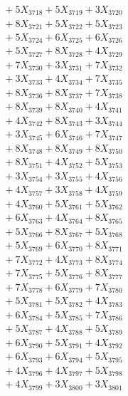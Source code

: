\documentclass[a4paper,10pt]{article}
\begin{document}
{\begin{align}
&\;  + 5 X_{3718} + 5 X_{3719} + 3 X_{3720} \\[0.3ex]
&\;  + 8 X_{3721} + 5 X_{3722} + 5 X_{3723} \\[0.3ex]
&\;  + 5 X_{3724} + 6 X_{3725} + 6 X_{3726} \\[0.3ex]
&\;  + 5 X_{3727} + 8 X_{3728} + 4 X_{3729} \\[0.5ex]\allowbreak
&\;  + 7 X_{3730} + 3 X_{3731} + 7 X_{3732} \\[0.3ex]
&\;  + 3 X_{3733} + 4 X_{3734} + 7 X_{3735} \\[0.3ex]
&\;  + 8 X_{3736} + 8 X_{3737} + 7 X_{3738} \\[0.3ex]
&\;  + 8 X_{3739} + 8 X_{3740} + 4 X_{3741} \\[0.3ex]
&\;  + 4 X_{3742} + 8 X_{3743} + 3 X_{3744} \\[0.3ex]
&\;  + 3 X_{3745} + 6 X_{3746} + 7 X_{3747} \\[0.3ex]
&\;  + 8 X_{3748} + 8 X_{3749} + 8 X_{3750} \\[0.3ex]
&\;  + 8 X_{3751} + 4 X_{3752} + 5 X_{3753} \\[0.3ex]
&\;  + 3 X_{3754} + 3 X_{3755} + 4 X_{3756} \\[0.3ex]
&\;  + 4 X_{3757} + 3 X_{3758} + 4 X_{3759} \\[0.5ex]\allowbreak
&\;  + 4 X_{3760} + 5 X_{3761} + 5 X_{3762} \\[0.3ex]
&\;  + 6 X_{3763} + 4 X_{3764} + 8 X_{3765} \\[0.3ex]
&\;  + 5 X_{3766} + 8 X_{3767} + 5 X_{3768} \\[0.3ex]
&\;  + 5 X_{3769} + 6 X_{3770} + 8 X_{3771} \\[0.3ex]
&\;  + 7 X_{3772} + 4 X_{3773} + 8 X_{3774} \\[0.3ex]
&\;  + 7 X_{3775} + 5 X_{3776} + 8 X_{3777} \\[0.3ex]
&\;  + 7 X_{3778} + 6 X_{3779} + 7 X_{3780} \\[0.3ex]
&\;  + 5 X_{3781} + 5 X_{3782} + 4 X_{3783} \\[0.3ex]
&\;  + 6 X_{3784} + 5 X_{3785} + 7 X_{3786} \\[0.3ex]
&\;  + 5 X_{3787} + 4 X_{3788} + 5 X_{3789} \\[0.5ex]\allowbreak
&\;  + 6 X_{3790} + 5 X_{3791} + 4 X_{3792} \\[0.3ex]
&\;  + 6 X_{3793} + 6 X_{3794} + 5 X_{3795} \\[0.3ex]
&\;  + 4 X_{3796} + 4 X_{3797} + 5 X_{3798} \\[0.3ex]
&\;  + 4 X_{3799} + 3 X_{3800} + 3 X_{3801} \\[0.3ex]

\end{align}}
\end{document}
